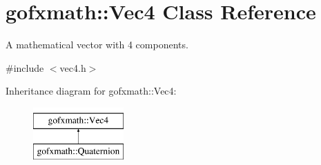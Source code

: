 \hypertarget{classgofxmath_1_1_vec4}{}\section{gofxmath\+:\+:Vec4 Class Reference}
\label{classgofxmath_1_1_vec4}


A mathematical vector with 4 components.  




{\ttfamily \#include $<$vec4.\+h$>$}

Inheritance diagram for gofxmath\+:\+:Vec4\+:\begin{figure}[H]
\begin{center}
\leavevmode
\includegraphics[height=2.000000cm]{classgofxmath_1_1_vec4}
\end{center}
\end{figure}
